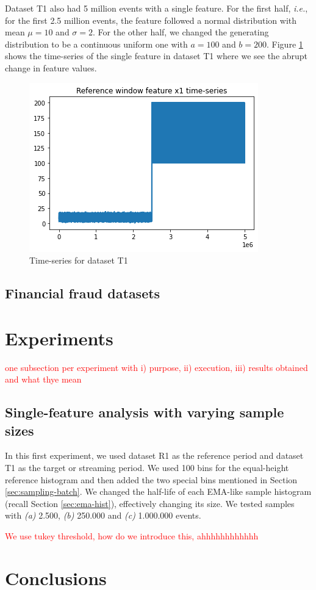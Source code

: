 Dataset T1 also had 5 million events with a single feature. For the first half, \textit{i.e.}, for the first 2.5 million events, the feature followed a normal distribution with mean $\mu=10$ and $\sigma=2$. For the other half, we changed the generating distribution to be a continuous uniform one with $a=100$ and $b=200$. Figure \ref{fig:timeseries-t1} shows the time-series of the single feature in dataset T1 where we see the abrupt change in feature values.

\begin{figure}[!htb]
    \begin{center}
      \includegraphics[scale=0.6]{figures/01-target.png}
      \caption[]{Time-series for dataset T1}
      \label{fig:timeseries-t1}
    \end{center}
\end{figure}



\subsection{Financial fraud datasets}

\section{Experiments}
\textcolor{red}{one subsection per experiment with i) purpose, ii) execution, iii) results obtained and what thye mean}

\subsection{Single-feature analysis with varying sample sizes}
In this first experiment, we used dataset R1 as the reference period and dataset T1 as the target or streaming period. We used 100 bins for the equal-height reference histogram and then added the two special bins mentioned in Section \ref{sec:sampling-batch}. We changed the half-life of each EMA-like sample histogram (recall Section \ref{sec:ema-hist}), effectively changing its size. We tested samples with \textit{(a)} 2.500, \textit{(b)} 250.000 and \textit{(c)} 1.000.000 events.

\textcolor{red}{We use tukey threshold, how do we introduce this, ahhhhhhhhhhhh}


\section{Conclusions}
